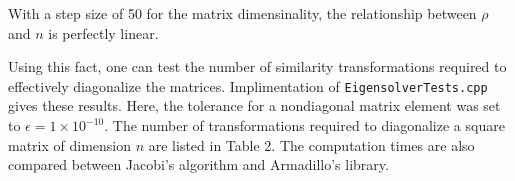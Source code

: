 \documentclass[11pt]{article}
\begin{document}
    With a step size of 50 for the matrix dimensinality, the relationship between $\rho$ and $n$ is perfectly linear.

    Using this fact, one can test the number of similarity transformations required to effectively diagonalize the matrices. Implimentation of \texttt{EigensolverTests.cpp} gives these results. Here, the tolerance for a nondiagonal matrix element was set to $ \epsilon = 1 \times 10^{-10}$. The number of transformations required to diagonalize a square matrix of dimension $n$ are listed in Table 2. The computation times are also compared between Jacobi's algorithm and Armadillo's library.

\end{document}
